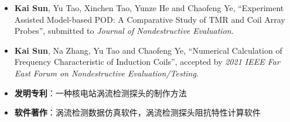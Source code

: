 \begin{itemize}
    \item \textbf{Kai Sun}, Yu Tao, Xinchen Tao, Yunze He and Chaofeng Ye,
          ``Experiment Assisted Model-based POD: A Comparative Study of TMR and Coil Array Probes'',
          submitted to \emph{Journal of Nondestructive Evaluation}.\\
          { \footnotesize {}}
    \item \textbf{Kai Sun}, Na Zhang, Yu Tao and Chaofeng Ye,
          ``Numerical Calculation of Frequency Characteristic of Induction Coils'',
          accepted by \emph{2021 IEEE Far East Forum on Nondestructive Evaluation/Testing}.\\
          { \footnotesize {}}
    \item \textbf{发明专利}：一种核电站涡流检测探头的制作方法
    \item \textbf{软件著作}：涡流检测数据仿真软件，涡流检测探头阻抗特性计算软件
\end{itemize}